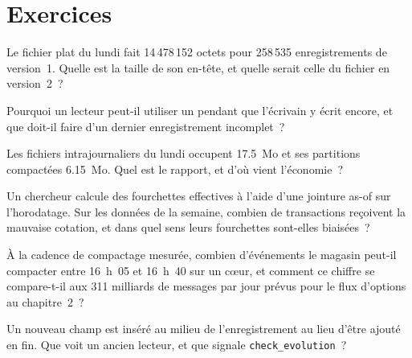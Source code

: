 \section{Exercices}

\begin{exercise}[$\star$]\label{exo:pl:a-tick-store-on-open-formats:1}
Le fichier plat du lundi fait 14\,478\,152 octets pour 258\,535 enregistrements de version~1. Quelle est la taille de son en-tête, et quelle serait celle du fichier
en version~2~?
\end{exercise}

\begin{exercise}[$\star$]\label{exo:pl:a-tick-store-on-open-formats:2}
Pourquoi un lecteur peut-il utiliser un  pendant que l'écrivain y écrit encore, et que doit-il faire d'un dernier enregistrement incomplet~?
\end{exercise}

\begin{exercise}[$\star$]\label{exo:pl:a-tick-store-on-open-formats:3}
Les fichiers intrajournaliers du lundi occupent 17.5~Mo et ses partitions compactées 6.15~Mo. Quel est le rapport, et d'où vient
l'économie~?
\end{exercise}

\begin{exercise}[$\star\star$]\label{exo:pl:a-tick-store-on-open-formats:4}
Un chercheur calcule des fourchettes effectives à l'aide d'une jointure as-of sur l'horodatage. Sur les données de la semaine, combien de transactions reçoivent la mauvaise
cotation, et dans quel sens leurs fourchettes sont-elles biaisées~?
\end{exercise}

\begin{exercise}[$\star\star$]\label{exo:pl:a-tick-store-on-open-formats:5}
À la cadence de compactage mesurée, combien d'événements le magasin peut-il compacter entre 16~h~05 et 16~h~40 sur un cœur, et
comment ce chiffre se compare-t-il aux 311 milliards de messages par jour prévus pour le flux d'options au chapitre~2~?
\end{exercise}

\begin{exercise}[$\star\star$]\label{exo:pl:a-tick-store-on-open-formats:6}
Un nouveau champ est inséré au milieu de l'enregistrement au lieu d'être ajouté en fin. Que voit un ancien lecteur, et que
signale \texttt{check\_evolution}~?
\end{exercise}

